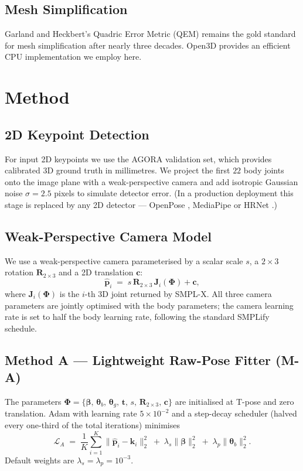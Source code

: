\documentclass[conference]{IEEEtran}
\begin{document}
\subsection{Mesh Simplification}
Garland and Heckbert's Quadric Error Metric (QEM) \cite{QED} remains the gold standard for mesh simplification after nearly three decades. Open3D \cite{Open3D} provides an efficient CPU implementation we employ here.

\section{Method}
\label{sec:method}

\subsection{2D Keypoint Detection}
For input 2D keypoints we use the AGORA \cite{AGORA} validation set, which provides calibrated 3D ground truth in millimetres. We project the first $22$ body joints onto the image plane with a weak-perspective camera and add isotropic Gaussian noise $\sigma = 2.5$ pixels to simulate detector error. (In a production deployment this stage is replaced by any 2D detector --- OpenPose \cite{OpenPose}, MediaPipe \cite{Mediapipe} or HRNet \cite{HRNet}.)

\subsection{Weak-Perspective Camera Model}
We use a weak-perspective camera \cite{weakpersp} parameterised by a scalar scale $s$, a $2\times 3$ rotation $\mathbf{R}_{2\times 3}$ and a 2D translation $\mathbf{c}$:
\begin{equation}
\hat{\mathbf{p}}_i \;=\; s\,\mathbf{R}_{2\times 3}\,\mathbf{J}_i(\boldsymbol{\Phi}) + \mathbf{c},
\end{equation}
where $\mathbf{J}_i(\boldsymbol{\Phi})$ is the $i$-th 3D joint returned by SMPL-X. All three camera parameters are jointly optimised with the body parameters; the camera learning rate is set to half the body learning rate, following the standard SMPLify schedule.

\subsection{Method A --- Lightweight Raw-Pose Fitter (\textsc{M-A})}
The parameters $\boldsymbol{\Phi} = \{\boldsymbol{\beta},\,\boldsymbol{\theta}_b,\,\boldsymbol{\theta}_g,\,\mathbf{t},\,s,\,\mathbf{R}_{2\times 3},\,\mathbf{c}\}$ are initialised at T-pose and zero translation. Adam \cite{Adam} with learning rate $5\times 10^{-2}$ and a step-decay scheduler (halved every one-third of the total iterations) minimises
\begin{equation}
\mathcal{L}_A \;=\; \frac{1}{K}\sum_{i=1}^{K}\|\hat{\mathbf{p}}_i - \mathbf{k}_i\|_2^2 \;+\; \lambda_s\|\boldsymbol{\beta}\|_2^2 \;+\; \lambda_p\|\boldsymbol{\theta}_b\|_2^2.
\end{equation}
Default weights are $\lambda_s = \lambda_p = 10^{-3}$.
\end{document}
